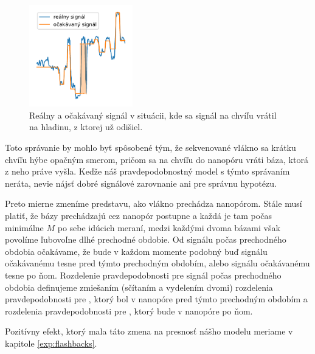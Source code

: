 \begin{figure}
\centerline{\includegraphics[width=0.4\textwidth]{images/cuvanie}}
\caption{Reálny a očakávaný signál v situácii, kde sa signál na chvíľu vrátil na hladinu, z ktorej už odišiel.}
\label{fig:flashback}
\end{figure}

Toto správanie by mohlo byť spôsobené tým, že sekvenované vlákno sa krátku chvíľu hýbe opačným smerom,
pričom sa na chvíľu do nanopóru vráti báza, ktorá z neho práve vyšla. Keďže náš pravdepodobnostný
model s týmto správaním neráta, nevie nájsť dobré signálové zarovnanie ani pre správnu hypotézu.

Preto mierne zmeníme predstavu, ako vlákno prechádza nanopórom. Stále musí platiť, že bázy prechádzajú 
cez
nanopór postupne a každá je tam počas minimálne $M$ po sebe idúcich meraní, medzi každými dvoma
bázami však povolíme ľubovoľne dlhé prechodné obdobie. Od signálu počas prechodného obdobia očakávame, 
že bude v každom momente podobný buď signálu očakávanému tesne pred týmto prechodným obdobím, alebo 
signálu očakávanému tesne po ňom. Rozdelenie pravdepodobnosti pre signál počas prechodného obdobia
definujeme zmiešaním (sčítaním a vydelením dvomi) rozdelenia pravdepodobnosti pre \kmer{}, ktorý bol 
v nanopóre pred týmto prechodným obdobím a rozdelenia pravdepodobnosti pre \kmer{}, ktorý
bude v nanopóre po ňom.

Pozitívny efekt, ktorý mala táto zmena na presnosť nášho modelu meriame v kapitole \ref{exp:flashbacks}.
